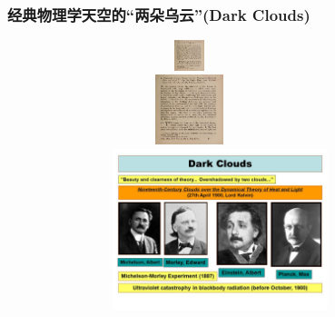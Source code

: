 \frame
{
	\frametitle{经典物理学天空的“两朵乌云”\textrm{(Dark Clouds)}}
\begin{figure}[h!]
\vspace*{-0.18in}
\centering
\includegraphics[height=0.35in,width=3.35in,viewport=0 900 1020 1030,clip]{Figures/Baron_Kelvin-Lecture.jpeg}
\includegraphics[height=0.80in,width=3.35in,viewport=0 50 1020 350,clip]{Figures/Baron_Kelvin-Lecture.jpeg}
\includegraphics[height=1.85in,width=4.05in,viewport=0 50 735 370,clip]{Figures/Two-dark-cloud-in-physics-2.jpg}
\label{two_Dark_Clouds_2}
\end{figure}
}

